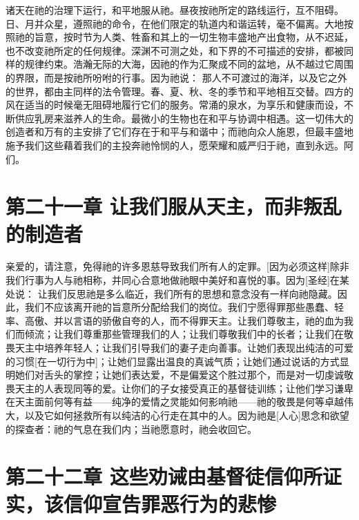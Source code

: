 诸天在祂的治理下运行，和平地服从祂。昼夜按祂所定的路线运行，互不阻碍。日、月并众星，遵照祂的命令，在他们限定的轨道内和谐运转，毫不偏离。大地按照祂的旨意，按时节为人类、牲畜和其上的一切生物丰盛地产出食物，从不迟延，也不改变祂所定的任何规律。深渊不可测之处，和下界的不可描述的安排，都被同样的规律约束。浩瀚无际的大海，因祂的作为汇聚成不同的盆地，从不越过它周围的界限，而是按祂所吩咐的行事。因为祂说：  那人不可渡过的海洋，以及它之外的世界，都由主同样的法令管理。春、夏、秋、冬的季节和平地相互交替。四方的风在适当的时候毫无阻碍地履行它们的服务。常涌的泉水，为享乐和健康而设，不断供应乳房来滋养人的生命。最微小的生物也在和平与协调中相遇。这一切伟大的创造者和万有的主安排了它们存在于和平与和谐中；而祂向众人施恩，但最丰盛地施予我们这些藉着我们的主投奔祂怜悯的人，愿荣耀和威严归于祂，直到永远。阿们。\par


\section{第二十一章 让我们服从天主，而非叛乱的制造者}

亲爱的，请注意，免得祂的许多恩慈导致我们所有人的定罪。[因为必须这样]除非我们行事为人与祂相称，并同心合意地做祂眼中美好和喜悦的事。因为[圣经]在某处说：  让我们反思祂是多么临近，我们所有的思想和意念没有一样向祂隐藏。因此，我们不应该离开祂的旨意所分配给我们的岗位。我们宁愿得罪那些愚蠢、轻率、高傲、并以言语的骄傲自夸的人，而不得罪天主。让我们尊敬主，祂的血为我们而倾流；让我们尊重那些管理我们的人；让我们尊敬我们中的长者；让我们在敬畏天主中培养年轻人；让我们引导我们的妻子走向善事。让她们表现出纯洁的可爱的习惯[在一切行为中]；让她们显露出温良的真诚气质；让她们通过说话的方式显明她们对舌头的掌控；让她们表达爱，不是偏爱这个胜过那个，而是对一切虔诚敬畏天主的人表现同等的爱。让你们的子女接受真正的基督徒训练；让他们学习谦卑在天主面前何等有益——纯净的爱情之灵能如何影响祂——祂的敬畏是何等卓越伟大，以及它如何拯救所有以纯洁的心行走在其中的人。因为祂是[人心]思念和欲望的探查者：祂的气息在我们内；当祂愿意时，祂会收回它。\par


\section{第二十二章 这些劝诫由基督徒信仰所证实，该信仰宣告罪恶行为的悲惨}

